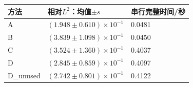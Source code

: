 \begin{tabular}{lll}\toprule
方法 & 相对$L^2$：均值$\pm s$ & 串行完整时间/秒 \\ \midrule
A & $(1.948\pm0.610)\times10^{-1}$ & 0.0481 \\
B & $(3.839\pm1.098)\times10^{-1}$ & 0.0450 \\
C & $(3.524\pm1.360)\times10^{-1}$ & 0.4037 \\
D & $(2.845\pm0.859)\times10^{-1}$ & 0.4097 \\
D\_unused & $(2.742\pm0.801)\times10^{-1}$ & 0.4122 \\
\bottomrule\end{tabular}
